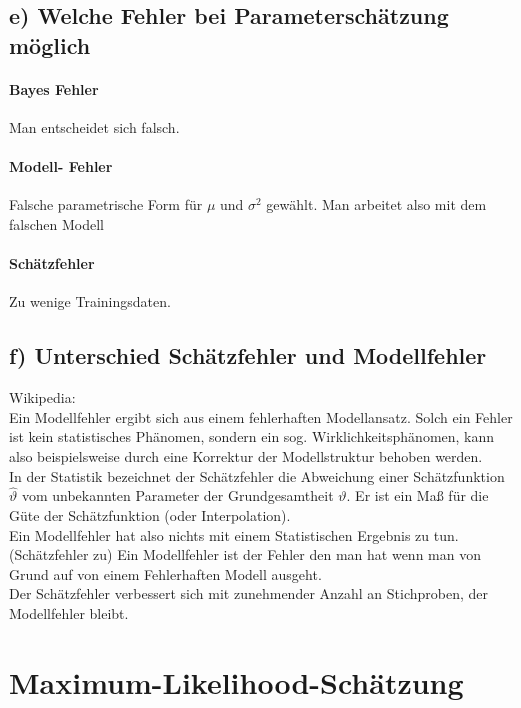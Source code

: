 \documentclass{scrartcl}
\begin{document}
\subsection*{e) Welche Fehler bei Parameterschätzung möglich}
\paragraph{Bayes Fehler} Man entscheidet sich falsch.
\paragraph{Modell- Fehler} Falsche parametrische Form für $\mu$ und $\sigma^2$ gewählt. Man arbeitet also mit dem falschen Modell
\paragraph{Schätzfehler} Zu wenige Trainingsdaten. 

\subsection*{f) Unterschied Schätzfehler und Modellfehler}
Wikipedia: \\
Ein Modellfehler ergibt sich aus einem fehlerhaften Modellansatz. Solch ein Fehler ist kein statistisches Phänomen, sondern ein sog. Wirklichkeitsphänomen, kann also beispielsweise durch eine Korrektur der Modellstruktur behoben werden. \\
In der Statistik bezeichnet der Schätzfehler die Abweichung einer Schätzfunktion $\hat{\vartheta}$ vom unbekannten Parameter der Grundgesamtheit $\vartheta$. Er ist ein Maß für die Güte der Schätzfunktion (oder Interpolation). \\

Ein Modellfehler hat also nichts mit einem Statistischen Ergebnis zu tun.(Schätzfehler zu) Ein Modellfehler ist der Fehler den man hat wenn man von Grund auf von einem Fehlerhaften Modell ausgeht. \\

Der Schätzfehler verbessert sich mit zunehmender Anzahl an Stichproben, der Modellfehler bleibt.

\section{Maximum-Likelihood-Schätzung}
\end{document}
